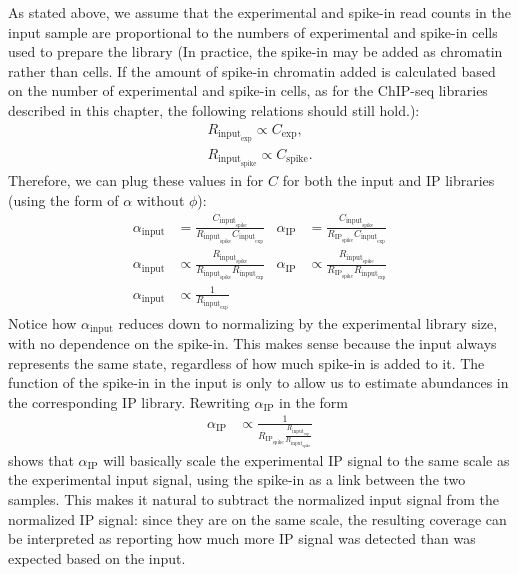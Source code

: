 As stated above, we assume that the experimental and spike-in read counts in the input sample are proportional to the numbers of experimental and spike-in cells used to prepare the library (In practice, the spike-in may be added as chromatin rather than cells. If the amount of spike-in chromatin added is calculated based on the number of experimental and spike-in cells, as for the ChIP-seq libraries described in this chapter, the following relations should still hold.):
\begin{align*}
    R_{\text{input}_\text{exp}} \propto C_\text{exp}, \\
    R_{\text{input}_\text{spike}} \propto C_\text{spike}.
\end{align*}
Therefore, we can plug these values in for $C$ for both the input and IP libraries (using the form of $\alpha$ without $\phi$):
\begin{align*}
    \alpha_\text{input} &= \frac{C_{\text{input}_\text{spike}}}{R_{\text{input}_\text{spike}} C_{\text{input}_\text{exp}}} &
    \alpha_\text{IP} &= \frac{C_{\text{input}_\text{spike}}}{R_{\text{IP}_\text{spike}} C_{\text{input}_\text{exp}}} \\
    \alpha_\text{input} &\propto \frac{R_{\text{input}_\text{spike}}}{R_{\text{input}_\text{spike}} R_{\text{input}_\text{exp}}} &
    \alpha_\text{IP} &\propto \frac{R_{\text{input}_\text{spike}}}{R_{\text{IP}_\text{spike}} R_{\text{input}_\text{exp}}} \\
    \alpha_\text{input} &\propto \frac{1}{R_{\text{input}_\text{exp}}} &
\end{align*}
Notice how $\alpha_\text{input}$ reduces down to normalizing by the experimental library size, with no dependence on the spike-in.
This makes sense because the input always represents the same state, regardless of how much spike-in is added to it.
The function of the spike-in in the input is only to allow us to estimate abundances in the corresponding IP library.
Rewriting $\alpha_\text{IP}$ in the form
\begin{align*}
    \alpha_\text{IP} &\propto \frac{1}{R_{\text{IP}_\text{spike}} \frac{R_{\text{input}_\text{exp}}}{R_{\text{input}_\text{spike}}}}
\end{align*}
shows that $\alpha_\text{IP}$ will basically scale the experimental IP signal to the same scale as the experimental input signal, using the spike-in as a link between the two samples.
This makes it natural to subtract the normalized input signal from the normalized IP signal: since they are on the same scale, the resulting coverage can be interpreted as reporting how much more IP signal was detected than was expected based on the input.

